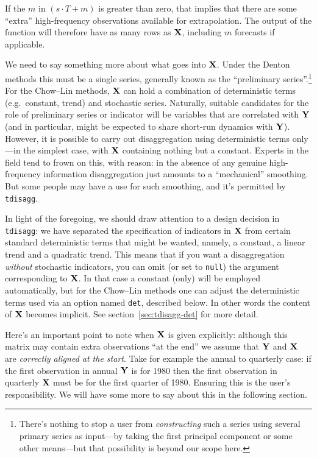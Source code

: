 If the $m$ in $(s \cdot T + m)$ is greater than zero, that implies
that there are some ``extra'' high-frequency observations available
for extrapolation. The output of the function will therefore have as
many rows as $\mathbf{X}$, including $m$ forecasts if applicable.

We need to say something more about what goes into $\mathbf{X}$. Under the
Denton methods this must be a single series, generally known as the
``preliminary series''.\footnote{There's nothing to stop a user from
  \textit{constructing} such a series using several primary series as
  input---by taking the first principal component or some other
  means---but that possibility is beyond our scope here.} For the
Chow--Lin methods, $\mathbf{X}$ can hold a combination of deterministic terms
(e.g.\ constant, trend) and stochastic series. Naturally, suitable
candidates for the role of preliminary series or indicator will be
variables that are correlated with $\mathbf{Y}$ (and in particular, might be
expected to share short-run dynamics with $\mathbf{Y}$). However, it is
possible to carry out disaggregation using deterministic terms
only---in the simplest case, with $\mathbf{X}$ containing nothing but a
constant. Experts in the field tend to frown on this, with reason: in
the absence of any genuine high-frequency information disaggregation
just amounts to a ``mechanical'' smoothing. But some people may have a
use for such smoothing, and it's permitted by \texttt{tdisagg}.

In light of the foregoing, we should draw attention to a design
decision in \texttt{tdisagg}: we have separated the specification of
indicators in $\mathbf{X}$ from certain standard deterministic terms that
might be wanted, namely, a constant, a linear trend and a quadratic
trend. This means that if you want a disaggregation \textit{without}
stochastic indicators, you can omit (or set to \texttt{null}) the
argument corresponding to $\mathbf{X}$. In that case a constant (only) will
be employed automatically, but for the Chow--Lin methods one can
adjust the deterministic terms used via an option named \texttt{det},
described below. In other words the content of $\mathbf{X}$ becomes
implicit. See section~\ref{sec:tdisagg-det} for more detail.

Here's an important point to note when $\mathbf{X}$ is given explicitly:
although this matrix may contain extra observations ``at the end'' we
assume that $\mathbf{Y}$ and $\mathbf{X}$ are \textit{correctly aligned at the
  start}. Take for example the annual to quarterly case: if the first
observation in annual $\mathbf{Y}$ is for 1980 then the first observation in
quarterly $\mathbf{X}$ must be for the first quarter of 1980. Ensuring this
is the user's responsibility. We will have some more to say about this
in the following section.

